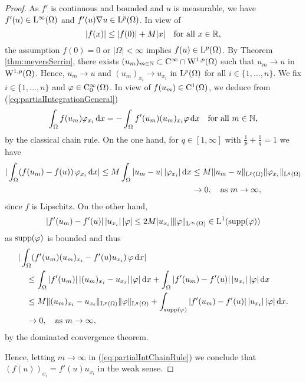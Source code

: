 \begin{proof}
  As $f'$ is continuous and bounded and $u$ is measurable, we have $f'(u)\in \mathrm{L}^\infty(\Omega)$ and $f'(u) \nabla u \in \mathrm{L}^p(\Omega)$.
  In view of 
  $$
  |f(x)| \leq |f(0)| + M|x| \quad\text{for all } x \in \mathbb{R},
  $$
  the assumption $f(0)= 0$ or $|\Omega| < \infty$ implies $f(u) \in \mathrm{L}^p(\Omega)$.
  By Theorem \ref{thm:meyersSerrin}, there exists $(u_m)_{m \in \mathbb{N}} \subset \mathrm{C}^\infty \cap \mathrm{W}^{1,p}(\Omega)$ such that $u_m \to u$ in $\mathrm{W}^{1,p}(\Omega)$. 
  Hence, $u_m \to u$ and $(u_m)_{x_i} \to u_{x_i}$ in $\mathrm{L}^p(\Omega)$ for all $i \in \{1,\dots,n\}$.
  We fix $i \in \{ 1, \dots, n\}$ and $\varphi \in \mathrm{C}_0^\infty(\Omega)$.
  In view of $f(u_m) \in \mathrm{C}^1(\Omega)$, we deduce from (\ref{eq:partialIntegrationGeneral})
  \begin{equation}
    \label{eq:partialIntChainRule}
    \int_\Omega f(u_m) \varphi_{x_i} \, {\operatorname{d}\!{x}} = -\int_\Omega f'(u_m) (u_m)_{x_i} \varphi \, {\operatorname{d}\!{x}} \quad\text{for all } m \in \mathbb{N},
  \end{equation}
  by the classical chain rule.
  On the one hand, for $q \in [1,\infty]$ with $\frac{1}{p} + \frac{1}{q} = 1$  we have
  \begin{align*}
    | \int_\Omega (f(u_m) - f(u))\, \varphi_{x_i} \, {\operatorname{d}\!{x}} |
    \leq M \int_{\Omega} |u_m - u|\, |\varphi_{x_i}| \, {\operatorname{d}\!{x}}
    &\leq M \|u_m - u\|_{\mathrm{L}^p(\Omega)} \|\varphi_{x_i}\|_{\mathrm{L}^q(\Omega)} \\
    &\to 0, \quad\text{as } m \to \infty,
  \end{align*}
  since $f$ is Lipschitz.
  On the other hand, 
  $$
  |f'(u_m) - f'(u)|\, |u_{x_i}|\, |\varphi| \leq 2M |u_{x_i}| \|\varphi\|_{\mathrm{L}^\infty(\Omega)} \in \mathrm{L}^1(\operatorname{supp}(\varphi))
  $$
  as $\operatorname{supp}(\varphi)$ is bounded and thus
  \begin{align*}
    &|\int_\Omega (f'(u_m) (u_m)_{x_i} - f'(u)u_{x_i})\, \varphi \, {\operatorname{d}\!{x}} | \\
    &\quad\leq \int_\Omega |f'(u_m)|\, |(u_m)_{x_i} - u_{x_i}|\,| \varphi | \, {\operatorname{d}\!{x}} 
    + \int_\Omega |f'(u_m) - f'(u)|\, |u_{x_i}|\, |\varphi| \, {\operatorname{d}\!{x}} \\
    &\quad\leq M \|(u_m)_{x_i} - u_{x_i}\|_{\mathrm{L}^p(\Omega)} \|\varphi\|_{\mathrm{L}^q(\Omega)}
    + \int_{\operatorname{supp}(\varphi)} |f'(u_m) - f'(u)|\, |u_{x_i}|\, |\varphi| \, {\operatorname{d}\!{x}} .
    \\&\quad \to 0, \quad\text{as } m \to \infty,
  \end{align*}
   by the dominated convergence theorem.

   Hence, letting $m \to \infty$ in (\ref{eq:partialIntChainRule})  we conclude that $(f(u))_{x_i} = f'(u)u_{x_i}$ in the weak sense.
\end{proof}

